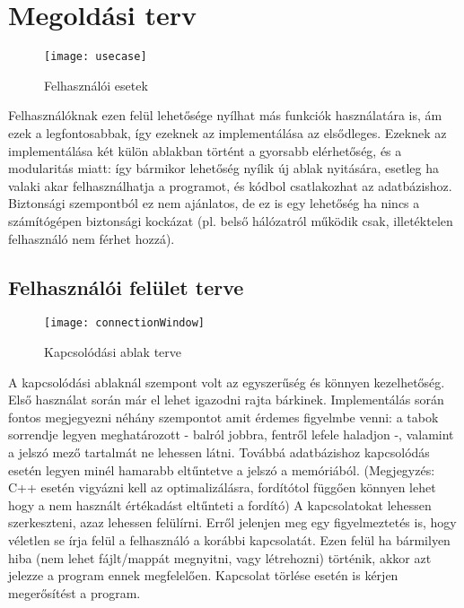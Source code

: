 \section{Megoldási terv}

\begin{figure}[ht]
  \begin{center}
  \texttt{[image: usecase]}
  \end{center}
 \caption{Felhasználói esetek}
\end{figure}

Felhasználóknak ezen felül lehetősége nyílhat más funkciók használatára is,
ám ezek a legfontosabbak, így ezeknek az implementálása az elsődleges.
Ezeknek az implementálása két külön ablakban történt a gyorsabb elérhetőség, és
a modularitás miatt: így bármikor lehetőség nyílik új ablak nyitására, esetleg
ha valaki akar felhasználhatja a programot, és kódbol csatlakozhat az adatbázishoz.
Biztonsági szempontból ez nem ajánlatos, de ez is egy lehetőség ha nincs a számítógépen
biztonsági kockázat (pl. belső hálózatról működik csak, illetéktelen felhasználó nem férhet hozzá).

\subsection{Felhasználói felület terve}
\begin{figure}[ht]
  \begin{center}
  \texttt{[image: connectionWindow]}
  \end{center}
 \caption{Kapcsolódási ablak terve}
\end{figure}

A kapcsolódási ablaknál szempont volt az egyszerűség és könnyen kezelhetőség. Első használat
során már el lehet igazodni rajta bárkinek. Implementálás során fontos megjegyezni néhány szempontot
amit érdemes figyelmbe venni: a tabok sorrendje legyen meghatározott - balról jobbra, fentről lefele haladjon -, valamint
a jelszó mező tartalmát ne lehessen látni. Továbbá adatbázishoz kapcsolódás esetén legyen minél hamarabb eltűntetve a
jelszó a memóriából. (Megjegyzés: C++ esetén vigyázni kell az optimalizálásra, fordítótol függően könnyen lehet hogy a nem használt értékadást
eltűnteti a fordító) A kapcsolatokat lehessen szerkeszteni, azaz lehessen felülírni. Erről jelenjen meg egy figyelmeztetés is,
hogy véletlen se írja felül a felhasználó a korábbi kapcsolatát. Ezen felül ha bármilyen hiba (nem lehet fájlt/mappát megnyitni, vagy létrehozni)
történik, akkor azt jelezze a program ennek megfelelően. Kapcsolat törlése esetén is kérjen megerősítést a program.

